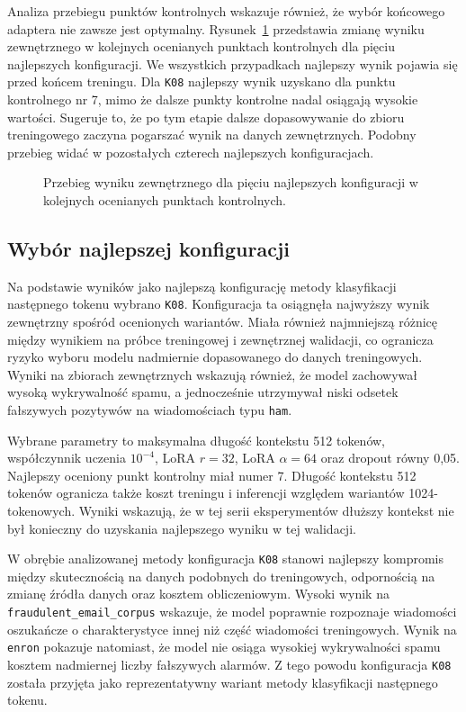 Analiza przebiegu punktów kontrolnych wskazuje również, że wybór końcowego adaptera
nie zawsze jest optymalny. Rysunek~\ref{fig:checkpoint-external-score-trajectory}
przedstawia zmianę wyniku zewnętrznego w kolejnych ocenianych punktach kontrolnych
dla pięciu najlepszych konfiguracji. We wszystkich przypadkach najlepszy wynik
pojawia się przed końcem treningu. Dla \texttt{K08} najlepszy wynik uzyskano dla
punktu kontrolnego nr 7, mimo że dalsze punkty kontrolne nadal osiągają wysokie wartości.
Sugeruje to, że po tym etapie dalsze dopasowywanie do zbioru treningowego
zaczyna pogarszać wynik na danych zewnętrznych. Podobny przebieg widać w
pozostałych czterech najlepszych konfiguracjach.

\begin{figure}[htbp]
\centering

\caption{Przebieg wyniku zewnętrznego dla pięciu najlepszych konfiguracji w
kolejnych ocenianych punktach kontrolnych.}
\label{fig:checkpoint-external-score-trajectory}
\end{figure}

\subsection{Wybór najlepszej konfiguracji}

Na podstawie wyników jako najlepszą konfigurację metody
klasyfikacji następnego tokenu wybrano \texttt{K08}. Konfiguracja ta osiągnęła najwyższy wynik zewnętrzny
spośród ocenionych wariantów. Miała również najmniejszą różnicę między wynikiem
na próbce treningowej i zewnętrznej walidacji,
co ogranicza ryzyko wyboru modelu nadmiernie dopasowanego do danych
treningowych. Wyniki na zbiorach zewnętrznych wskazują również, że model
zachowywał wysoką wykrywalność spamu, a jednocześnie utrzymywał niski odsetek
fałszywych pozytywów na wiadomościach typu \texttt{ham}. 

Wybrane parametry to maksymalna długość kontekstu 512 tokenów, współczynnik uczenia
\(10^{-4}\), LoRA \(r=32\), LoRA \(\alpha=64\) oraz dropout równy 0,05.
Najlepszy oceniony punkt kontrolny miał numer 7. Długość kontekstu 512
tokenów ogranicza także koszt treningu i inferencji względem wariantów
1024-tokenowych. Wyniki wskazują, że w tej serii eksperymentów dłuższy kontekst
nie był konieczny do uzyskania najlepszego wyniku w tej walidacji.

W obrębie analizowanej metody konfiguracja \texttt{K08} stanowi najlepszy
kompromis między skutecznością na danych podobnych do treningowych, odpornością
na zmianę źródła danych oraz kosztem obliczeniowym. Wysoki wynik na
\texttt{fraudulent\_email\_corpus} wskazuje, że model poprawnie rozpoznaje
wiadomości oszukańcze o charakterystyce innej niż część wiadomości treningowych.
Wynik na \texttt{enron} pokazuje natomiast, że model nie osiąga wysokiej
wykrywalności spamu kosztem nadmiernej liczby fałszywych alarmów. Z tego
powodu konfiguracja \texttt{K08} została przyjęta jako reprezentatywny wariant
metody klasyfikacji następnego tokenu.


